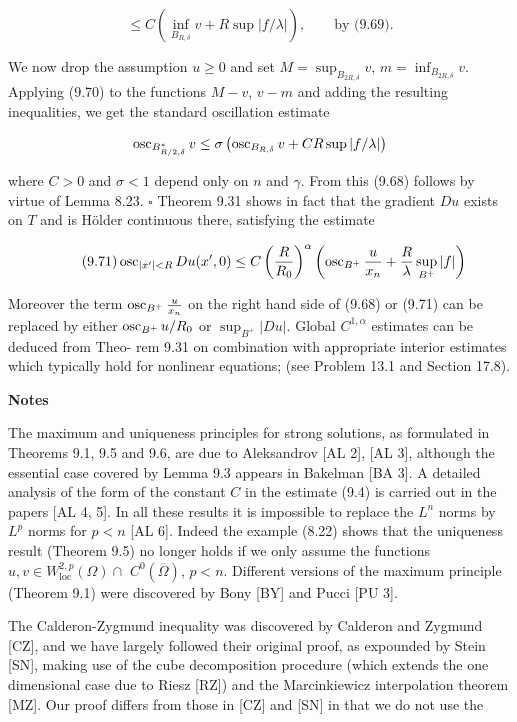 \[
\leq C\left(\inf_{B_{R,\delta}} v + R \sup |f/\lambda|\right), \qquad \text{by (9.69).}
\]

We now drop the assumption $u \geq 0$ and set $M = \sup_{B_{2R,\delta}} v$, $m = \inf_{B_{2R,\delta}} v$. Applying (9.70)
to the functions $M - v$, $v - m$ and adding the resulting inequalities, we get the
standard oscillation estimate

\[
\operatorname{osc}_{B^*_{R/2,\delta}} v \leq \sigma\left(\operatorname{osc}_{B_{R,\delta}} v + C R \sup |f/\lambda|\right)
\]

where $C > 0$ and $\sigma < 1$ depend only on $n$ and $\gamma$. From this (9.68) follows by virtue
of Lemma 8.23. $\square$
Theorem 9.31 shows in fact that the gradient $Du$ exists on $T$ and is H\"older
continuous there, satisfying the estimate

\begin{equation}
\tag{9.71}
\operatorname{osc}_{|x'|<R} Du(x',0) \leq C\left(\frac{R}{R_0}\right)^{\alpha}
\left(\operatorname{osc}_{B^+} \frac{u}{x_n} + \frac{R}{\lambda} \sup_{B^+} |f|\right)
\end{equation}

Moreover the term $\operatorname{osc}_{B^+} \frac{u}{x_n}$ on the right hand side of (9.68) or (9.71) can be replaced
by either $\operatorname{osc}_{B^+} u/R_0$ or $\sup_{B^+} |Du|$. Global $C^{1,\alpha}$ estimates can be deduced from Theo-
rem 9.31 on combination with appropriate interior estimates which typically hold
for nonlinear equations; (see Problem 13.1 and Section 17.8).

\bigskip

\noindent\textbf{Notes}

\medskip

The maximum and uniqueness principles for strong solutions, as formulated in
Theorems 9.1, 9.5 and 9.6, are due to Aleksandrov [AL 2], [AL 3], although the
essential case covered by Lemma 9.3 appears in Bakelman [BA 3]. A detailed
analysis of the form of the constant $C$ in the estimate (9.4) is carried out in the papers
[AL 4, 5]. In all these results it is impossible to replace the $L^n$ norms by $L^p$ norms
for $p < n$ [AL 6]. Indeed the example (8.22) shows that the uniqueness result
(Theorem 9.5) no longer holds if we only assume the functions $u, v \in W^{2,p}_{\mathrm{loc}}(\Omega) \cap$
$C^0(\overline{\Omega})$, $p < n$. Different versions of the maximum principle (Theorem 9.1) were
discovered by Bony [BY] and Pucci [PU 3].

The Calderon-Zygmund inequality was discovered by Calderon and Zygmund
[CZ], and we have largely followed their original proof, as expounded by Stein
[SN], making use of the cube decomposition procedure (which extends the one
dimensional case due to Riesz [RZ]) and the Marcinkiewicz interpolation theorem
[MZ]. Our proof differs from those in [CZ] and [SN] in that we do not use the


